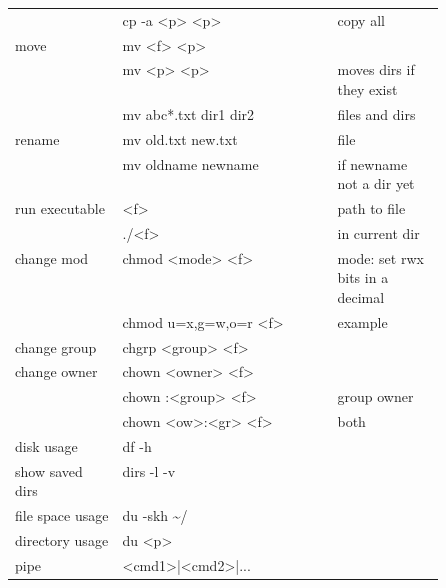 {\begin{tabularx}{\linewidth}{@{} p{0.25\linewidth}>{\ttfamily}lp{0.25\linewidth} @{}}
                             & cp -a <p> <p>              & copy all                         \\
        move                 & mv <f> <p>                 &                                  \\
                             & mv <p> <p>                 & moves dirs if they exist         \\
                             & mv abc*.txt dir1 dir2      & files and dirs                   \\
        rename               & mv old.txt new.txt         & file                             \\
                             & mv oldname newname         & if newname not a dir yet         \\
        run executable       & <f>                        & path to file                     \\
                             & ./<f>                      & in current dir                   \\%
        change mod           & chmod <mode> <f>           & mode: set rwx bits in a decimal  \\
                             & chmod u=x,g=w,o=r <f>      & example                          \\
        change group         & chgrp <group> <f>          &                                  \\
        change owner         & chown <owner> <f>          &                                  \\
                             & chown :<group> <f>         & group owner                      \\%
                             & chown <ow>:<gr> <f>        & both                             \\
        disk usage           & df -h                      &                                  \\
        show saved dirs      & dirs -l -v                 &                                  \\
        file space usage     & du -skh \textasciitilde{}/ &                                  \\
        directory usage      & du <p>                     &                                  \\
        pipe                 & <cmd1>|<cmd2>|...          &                                  \\ %

\end{tabularx}}
